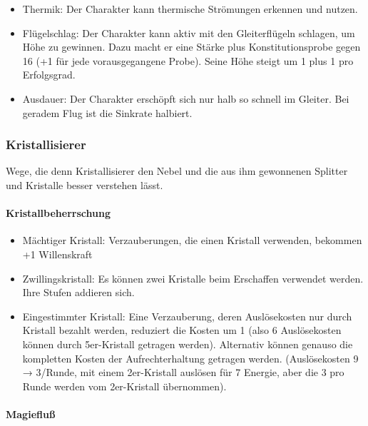\documentclass{article}
\begin{document}
\begin{itemize}
\item Thermik: Der Charakter kann thermische Strömungen erkennen und nutzen.
\item Flügelschlag: Der Charakter kann aktiv mit den Gleiterflügeln schlagen, um Höhe zu gewinnen. Dazu macht er eine Stärke plus Konstitutionsprobe gegen 16 (+1 für jede vorausgegangene Probe). Seine Höhe steigt um 1 plus 1 pro Erfolgsgrad.
\item Ausdauer: Der Charakter erschöpft sich nur halb so schnell im Gleiter. Bei geradem Flug ist die Sinkrate halbiert.
\end{itemize}

\subsubsection{Kristallisierer}

Wege, die denn Kristallisierer den Nebel und die aus ihm gewonnenen Splitter und Kristalle besser verstehen lässt.

\paragraph{Kristallbeherrschung}

\begin{itemize}
\item Mächtiger Kristall: Verzauberungen, die einen Kristall verwenden, bekommen +1 Willenskraft
\item Zwillingskristall: Es können zwei Kristalle beim Erschaffen verwendet werden. Ihre Stufen addieren sich.
\item Eingestimmter Kristall: Eine Verzauberung, deren Auslösekosten nur durch Kristall bezahlt werden, reduziert die Kosten um 1 (also 6 Auslösekosten können durch 5er-Kristall getragen werden). Alternativ können genauso die kompletten Kosten der Aufrechterhaltung getragen werden. (Auslösekosten 9 → 3/Runde, mit einem 2er-Kristall auslösen für 7 Energie, aber die 3 pro Runde werden vom 2er-Kristall übernommen).
\end{itemize}

\paragraph{Magiefluß}
\end{document}
